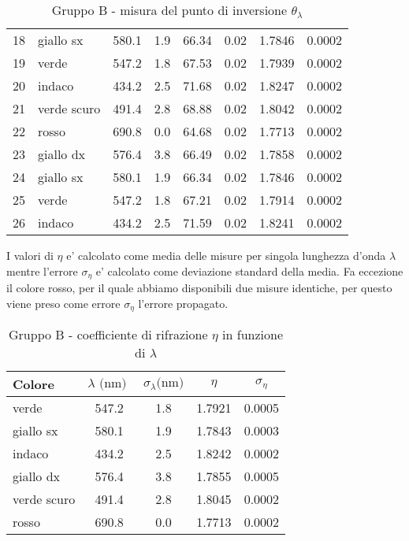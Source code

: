 \begin{table}[!htbp]
{\begin{tabular}{clcccrcc}
        18  &   giallo sx    &   580.1  & 1.9 &  66.34 &   0.02  & 1.7846 & 0.0002  \\
        19  &   verde        &   547.2  & 1.8 &  67.53 &   0.02  & 1.7939 & 0.0002  \\
        20  &   indaco       &   434.2  & 2.5 &  71.68 &   0.02  & 1.8247 & 0.0002  \\
        21  &   verde scuro  &   491.4  & 2.8 &  68.88 &   0.02  & 1.8042 & 0.0002  \\
        22  &   rosso        &   690.8  & 0.0 &  64.68 &   0.02  & 1.7713 & 0.0002  \\
        23  &   giallo dx    &   576.4  & 3.8 &  66.49 &   0.02  & 1.7858 & 0.0002  \\
        24  &   giallo sx    &   580.1  & 1.9 &  66.34 &   0.02  & 1.7846 & 0.0002  \\
        25  &   verde        &   547.2  & 1.8 &  67.21 &   0.02  & 1.7914 & 0.0002  \\
        26  &   indaco       &   434.2  & 2.5 &  71.59 &   0.02  & 1.8241 & 0.0002  \\
        \hline
    \end{tabular}
    \par}
    \caption{Gruppo B - misura del punto di inversione $\theta_{\lambda}$}
\end{table}

I valori di $\eta$ e' calcolato come media delle misure per singola lunghezza d'onda $\lambda$ mentre l'errore $\sigma_{\eta}$ e' calcolato come deviazione standard della media.
Fa eccezione il colore rosso, per il quale abbiamo disponibili due misure identiche, per questo viene preso come errore $\sigma_{\eta}$ l'errore propagato.

\begin{table}[!htbp]
    {\par\centering
    \begin{tabular}{lcccc}
        \hline
            Colore & 
            $\lambda \text{ (nm) }$ &
            $\sigma_{\lambda} \text{(nm)}$ & 
            $\eta$ &
            $\sigma_{\eta}$ \\
        \hline
        verde        &   547.2  & 1.8 &  1.7921 &   0.0005 \\
        giallo sx    &   580.1  & 1.9 &  1.7843 &   0.0003 \\
        indaco       &   434.2  & 2.5 &  1.8242 &   0.0002 \\
        giallo dx    &   576.4  & 3.8 &  1.7855 &   0.0005 \\
        verde scuro  &   491.4  & 2.8 &  1.8045 &   0.0002 \\
        rosso        &   690.8  & 0.0 &  1.7713 &   0.0002 \\
        \hline
    \end{tabular}
    \par}
    \caption{Gruppo B - coefficiente di rifrazione $\eta$ in funzione di $\lambda$}
\end{table}

